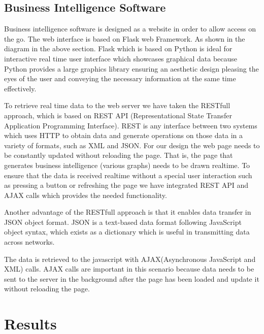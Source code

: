 \documentclass[12pt,a4paper]{report}
\begin{document}
\section{Business Intelligence Software}

Business intelligence software is designed as a website in order to allow access on the go. The web interface is based on Flask web Framework. As shown in the diagram in the above section. Flask which is based on Python is ideal for interactive real time user interface which showcases graphical data because Python provides a large graphics library ensuring an aesthetic design pleasing the eyes of the user and conveying the necessary information at the same time effectively. 

\par To retrieve real time data to the web server we have taken the RESTfull approach, which is based on REST API (Representational State Transfer Application Programming Interface).  REST is any interface between two systems which uses HTTP to obtain data and generate operations on those data in a variety of formats, such as XML and JSON. For our design the web page needs to be constantly updated without reloading the page. That is, the page that generates business intelligence (various graphs) needs to be drawn realtime. To ensure that the data is received realtime without a special user interaction such as pressing a button or refreshing the page we have integrated REST API and AJAX calls which provides the needed functionality. 

\par Another advantage of the RESTfull approach is that it enables data transfer in JSON object format. JSON is a text-based data format following JavaScript object syntax, which exists as a dictionary which is useful in transmitting data across networks.

\par The data is retrieved to the javascript with AJAX(Asynchronous JavaScript and XML) calls. AJAX calls are important in this scenario because data needs to be sent to the server in the background after the page has been loaded and update it without reloading the page. 


\chapter{Results}
\end{document}
